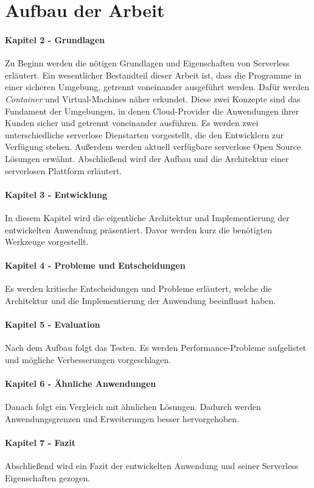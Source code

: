 \section{Aufbau der Arbeit}
\paragraph{Kapitel 2 - Grundlagen} Zu Beginn werden die nötigen Grundlagen und Eigenschaften von Serverless erläutert.
Ein wesentlicher Bestandteil dieser Arbeit ist, dass die Programme in einer sicheren Umgebung,
getrennt voneinander ausgeführt werden. Dafür werden
\textit{Container} und Virtual-Machines 
näher erkundet. Diese zwei Konzepte sind das Fundament der Umgebungen, in denen Cloud-Provider die 
Anwendungen ihrer Kunden sicher und getrennt voneinander ausführen.
Es werden zwei unterschiedliche serverlose Dienstarten vorgestellt, die den Entwicklern zur Verfügung stehen.
Außerdem werden aktuell verfügbare serverlose Open Source Lösungen erwähnt.
Abschließend wird der Aufbau und die Architektur einer serverlosen Plattform erläutert.

\paragraph{Kapitel 3 - Entwicklung} In diesem Kapitel wird die eigentliche Architektur
und Implementierung der entwickelten Anwendung präsentiert. Davor werden kurz die benötigten Werkzeuge
vorgestellt.

\paragraph{Kapitel 4 - Probleme und Entscheidungen} Es werden kritische Entscheidungen und
Probleme erläutert, welche die Architektur und die Implementierung der Anwendung beeinflusst haben.

\paragraph{Kapitel 5 - Evaluation} Nach dem Aufbau folgt das Testen.
Es werden Performance-Probleme aufgelistet und mögliche Verbesserungen vorgeschlagen.

\paragraph{Kapitel 6 - Ähnliche Anwendungen} Danach folgt ein Vergleich mit ähnlichen Lösungen.
Dadurch werden Anwendungsgrenzen und Erweiterungen besser hervorgehoben.

\paragraph{Kapitel 7 - Fazit} Abschließend wird ein Fazit der entwickelten Anwendung und
seiner Serverless Eigenschaften gezogen.
